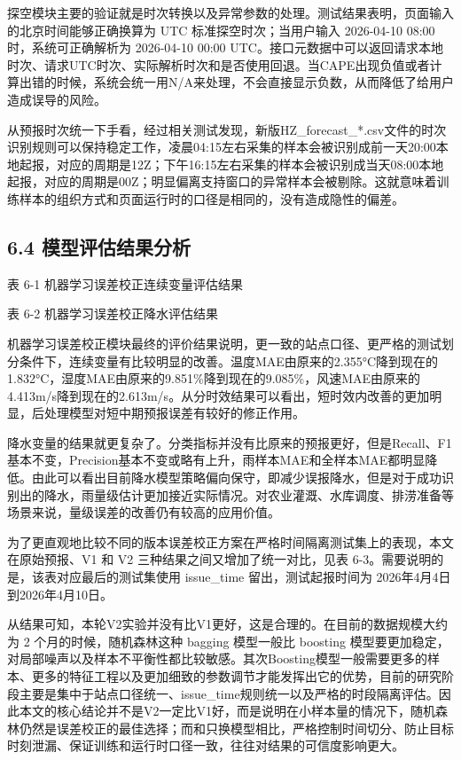 探空模块主要的验证就是时次转换以及异常参数的处理。测试结果表明，页面输入的北京时间能够正确换算为 UTC 标准探空时次；当用户输入 2026-04-10 08:00 时，系统可正确解析为 2026-04-10 00:00 UTC。接口元数据中可以返回请求本地时次、请求UTC时次、实际解析时次和是否使用回退。当CAPE出现负值或者计算出错的时候，系统会统一用N/A来处理，不会直接显示负数，从而降低了给用户造成误导的风险。

从预报时次统一下手看，经过相关测试发现，新版HZ\_forecast\_*.csv文件的时次识别规则可以保持稳定工作，凌晨04:15左右采集的样本会被识别成前一天20:00本地起报，对应的周期是12Z；下午16:15左右采集的样本会被识别成当天08:00本地起报，对应的周期是00Z；明显偏离支持窗口的异常样本会被剔除。这就意味着训练样本的组织方式和页面运行时的口径是相同的，没有造成隐性的偏差。

\subsection{6.4 模型评估结果分析}

表 6-1  机器学习误差校正连续变量评估结果

表 6-2  机器学习误差校正降水评估结果

机器学习误差校正模块最终的评价结果说明，更一致的站点口径、更严格的测试划分条件下，连续变量有比较明显的改善。温度MAE由原来的2.355°C降到现在的1.832°C，湿度MAE由原来的9.851\%降到现在的9.085\%，风速MAE由原来的4.413m/s降到现在的2.613m/s。从分时效结果可以看出，短时效内改善的更加明显，后处理模型对短中期预报误差有较好的修正作用。

降水变量的结果就更复杂了。分类指标并没有比原来的预报更好，但是Recall、F1基本不变，Precision基本不变或略有上升，雨样本MAE和全样本MAE都明显降低。由此可以看出目前降水模型策略偏向保守，即减少误报降水，但是对于成功识别出的降水，雨量级估计更加接近实际情况。对农业灌溉、水库调度、排涝准备等场景来说，量级误差的改善仍有较高的应用价值。

为了更直观地比较不同的版本误差校正方案在严格时间隔离测试集上的表现，本文在原始预报、V1 和 V2 三种结果之间又增加了统一对比，见表 6-3。需要说明的是，该表对应最后的测试集使用 issue\_time 留出，测试起报时间为 2026年4月4日到2026年4月10日。

从结果可知，本轮V2实验并没有比V1更好，这是合理的。在目前的数据规模大约为 2 个月的时候，随机森林这种 bagging 模型一般比 boosting 模型要更加稳定，对局部噪声以及样本不平衡性都比较敏感。其次Boosting模型一般需要更多的样本、更多的特征工程以及更加细致的参数调节才能发挥出它的优势，目前的研究阶段主要是集中于站点口径统一、issue\_time规则统一以及严格的时段隔离评估。因此本文的核心结论并不是V2一定比V1好，而是说明在小样本量的情况下，随机森林仍然是误差校正的最佳选择；而和只换模型相比，严格控制时间切分、防止目标时刻泄漏、保证训练和运行时口径一致，往往对结果的可信度影响更大。

